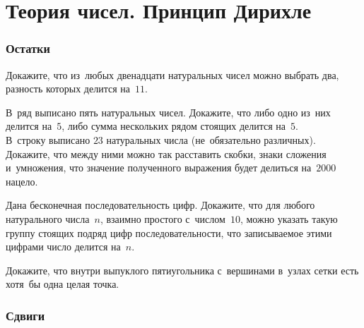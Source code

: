 
\section*{Теория чисел. Принцип Дирихле}


\begingroup
    \def\abs#1{\lvert #1 \rvert}

\subsubsection*{Остатки}

\begin{problems}

\item
Докажите, что из~любых двенадцати натуральных чисел можно выбрать два,
разность которых делится на~$11$.

\item
\subproblem
В~ряд выписано пять натуральных чисел.
Докажите, что либо одно из~них делится на~$5$, либо сумма нескольких рядом
стоящих делится на~$5$.
\\
\subproblem
В~строку выписано $23$ натуральных числа (не~обязательно различных).
Докажите, что между ними можно так расставить скобки, знаки сложения
и~умножения, что значение полученного выражения будет делиться на~$2000$
нацело.

\item
Дана бесконечная последовательность цифр.
Докажите, что для любого натурального числа~$n$, взаимно простого
с~числом~$10$, можно указать такую группу стоящих подряд цифр
последовательности, что записываемое этими цифрами число делится на~$n$.

\item
Докажите, что внутри выпуклого пятиугольника с~вершинами в~узлах сетки есть
хотя~бы одна целая точка.

\end{problems}

\subsubsection*{Сдвиги}

